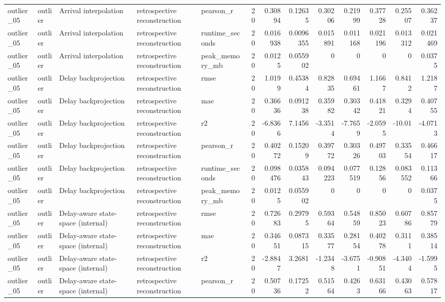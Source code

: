 \begin{table}[!htbp]
{{\begin{tabular}{lllllrrrrrrrr}
outlier_05 & outlier & Arrival interpolation & retrospective reconstruction & pearson_r & 20 & 0.30894 & 0.12635 & 0.30206 & 0.21999 & 0.37728 & 0.25507 & 0.36237 \\
outlier_05 & outlier & Arrival interpolation & retrospective reconstruction & runtime_seconds & 20 & 0.016938 & 0.0096355 & 0.015891 & 0.011168 & 0.021196 & 0.013312 & 0.021469 \\
outlier_05 & outlier & Arrival interpolation & retrospective reconstruction & peak_memory_mb & 20 & 0.0125 & 0.055902 & 0 & 0 & 0 & 0 & 0.0375 \\
outlier_05 & outlier & Delay backprojection & retrospective reconstruction & rmse & 20 & 1.0199 & 0.45384 & 0.82835 & 0.69461 & 1.1667 & 0.8412 & 1.2187 \\
outlier_05 & outlier & Delay backprojection & retrospective reconstruction & mae & 20 & 0.36636 & 0.091238 & 0.35982 & 0.30342 & 0.41821 & 0.3294 & 0.40755 \\
outlier_05 & outlier & Delay backprojection & retrospective reconstruction & r2 & 20 & -6.8366 & 7.1456 & -3.3514 & -7.7659 & -2.0595 & -10.01 & -4.0713 \\
outlier_05 & outlier & Delay backprojection & retrospective reconstruction & pearson_r & 20 & 0.40272 & 0.15209 & 0.39772 & 0.30326 & 0.49703 & 0.33554 & 0.46617 \\
outlier_05 & outlier & Delay backprojection & retrospective reconstruction & runtime_seconds & 20 & 0.098476 & 0.035843 & 0.094223 & 0.077519 & 0.12856 & 0.083552 & 0.11366 \\
outlier_05 & outlier & Delay backprojection & retrospective reconstruction & peak_memory_mb & 20 & 0.0125 & 0.055902 & 0 & 0 & 0 & 0 & 0.0375 \\
outlier_05 & outlier & Delay-aware state-space (internal) & retrospective reconstruction & rmse & 20 & 0.72683 & 0.29795 & 0.59364 & 0.54859 & 0.85023 & 0.60786 & 0.85779 \\
outlier_05 & outlier & Delay-aware state-space (internal) & retrospective reconstruction & mae & 20 & 0.34651 & 0.087315 & 0.33577 & 0.28154 & 0.40278 & 0.3111 & 0.38514 \\
outlier_05 & outlier & Delay-aware state-space (internal) & retrospective reconstruction & r2 & 20 & -2.8847 & 3.2681 & -1.2348 & -3.6751 & -0.90851 & -4.3404 & -1.5995 \\
outlier_05 & outlier & Delay-aware state-space (internal) & retrospective reconstruction & pearson_r & 20 & 0.50736 & 0.17252 & 0.51564 & 0.4263 & 0.63166 & 0.43063 & 0.57817 \\

\end{tabular}}}
\end{table}

